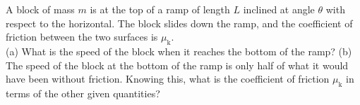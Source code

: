 A block of mass $m$ is at the top of a ramp of length $L$ inclined at
angle $\theta$ with respect to the horizontal. The block slides down
the ramp, and the coefficient of friction between the two surfaces is
$\mu_\text{k}$.\\
%
(a) What is the speed of the block when it reaches the bottom of the
ramp?\answercheck\hwendpart
%
(b) The speed of the block at the bottom of the ramp is only half of
what it would have been without friction. Knowing this, what is the
coefficient of friction $\mu_\text{k}$ in terms of the other given
quantities?\answercheck
